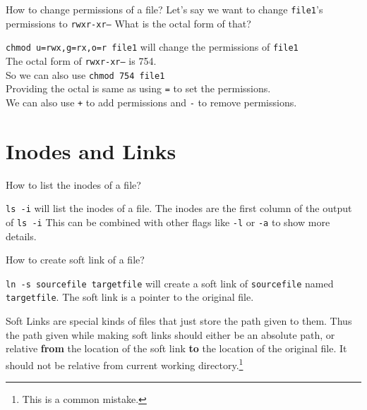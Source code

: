\begin{qs}
  How to change permissions of a file?
  Let's say we want to change \texttt{file1}'s permissions to \texttt{rwxr-xr--}
  What is the octal form of that?
\end{qs}

\begin{ans}
  \texttt{chmod u=rwx,g=rx,o=r file1} will change the permissions of \texttt{file1}\\
  The octal form of \texttt{rwxr-xr--} is 754.\\
  So we can also use \texttt{chmod 754 file1}\\
  Providing the octal is same as using \texttt{=} to set the permissions.\\
  We can also use \texttt{+} to add permissions and \texttt{-} to remove permissions.
\end{ans}

\section{Inodes and Links}

\begin{qs}
  How to list the inodes of a file?
\end{qs}

\begin{ans}
  \texttt{ls -i} will list the inodes of a file.
  The inodes are the first column of the output of \texttt{ls -i}
  This can be combined with other flags like \texttt{-l} or \texttt{-a} to show more details.
\end{ans}

\begin{qs}
  How to create soft link of a file?
\end{qs}

\begin{ans}
  \texttt{ln -s sourcefile targetfile} will create a soft link of \texttt{sourcefile}
  named \texttt{targetfile}.
  The soft link is a pointer to the original file.
\end{ans}

\begin{definition}
  Soft Links are special kinds of files that just store the path
  given to them. Thus the path given while making soft links should
  either be an absolute path, or relative \textbf{from} the location of the
  soft link \textbf{to} the location of the original file. It should not be
  relative from current working directory.\footnote{This is a common mistake.}
\end{definition}

